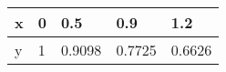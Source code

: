 \documentclass{article}
\begin{document}
\begin{table}[h!]
\begin{tabular}{l|l|l|l|l}

\multicolumn{1}{p{30.865313pt}}{\raggedright x} & \multicolumn{1}{|p{31.618126pt}}{\raggedright 0} & \multicolumn{1}{|p{33.12375pt}}{\raggedright 0.5} & \multicolumn{1}{|p{33.876564pt}}{\raggedright 0.9} & \multicolumn{1}{|p{37.640625pt}}{\raggedright 1.2}\\ 
\hline 
\multicolumn{1}{p{30.865313pt}}{\raggedright y} & \multicolumn{1}{|p{31.618126pt}}{\raggedright 1} & \multicolumn{1}{|p{33.12375pt}}{\raggedright 0.9098} & \multicolumn{1}{|p{33.876564pt}}{\raggedright 0.7725} & \multicolumn{1}{|p{37.640625pt}}{\raggedright 0.6626}\\ 


\end{tabular}
\end{table}
\end{document}
